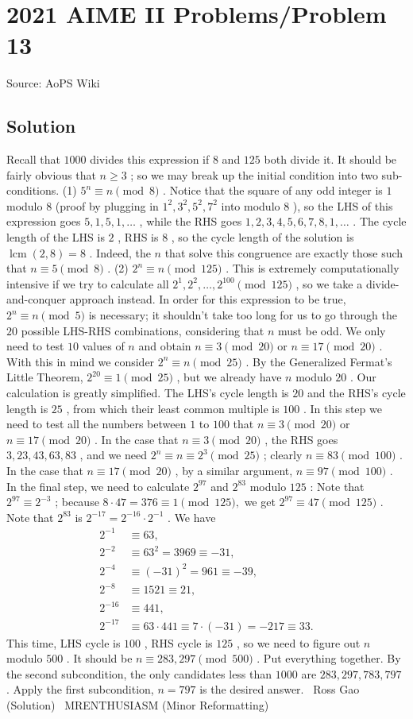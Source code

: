 \documentclass[12pt]{article}
\begin{document}
\section*{{2021 AIME II Problems/Problem 13}}
Source: AoPS Wiki

\subsection*{Solution}
Recall that $1000$ divides this expression if $8$ and $125$ both divide it. It should be fairly obvious that $n \geq 3$ ; so we may break up the initial condition into two sub-conditions. (1) $5^n \equiv n \pmod{8}$ . Notice that the square of any odd integer is $1$ modulo $8$ (proof by plugging in $1^2,3^2,5^2,7^2$ into modulo $8$ ), so the LHS of this expression goes $5,1,5,1,\ldots$ , while the RHS goes $1,2,3,4,5,6,7,8,1,\ldots$ . The cycle length of the LHS is $2$ , RHS is $8$ , so the cycle length of the solution is $\operatorname{lcm}(2,8)=8$ . Indeed, the $n$ that solve this congruence are exactly those such that $n \equiv 5 \pmod{8}$ . (2) $2^n \equiv n \pmod{125}$ . This is extremely computationally intensive if we try to calculate all $2^1,2^2,\ldots,2^{100} \pmod{125}$ , so we take a divide-and-conquer approach instead. In order for this expression to be true, $2^n \equiv n \pmod{5}$ is necessary; it shouldn't take too long for us to go through the $20$ possible LHS-RHS combinations, considering that $n$ must be odd. We only need to test $10$ values of $n$ and obtain $n \equiv 3 \pmod{20}$ or $n \equiv 17 \pmod{20}$ . With this in mind we consider $2^n \equiv n \pmod{25}$ . By the Generalized Fermat's Little Theorem, $2^{20} \equiv 1 \pmod{25}$ , but we already have $n$ modulo $20$ . Our calculation is greatly simplified. The LHS's cycle length is $20$ and the RHS's cycle length is $25$ , from which their least common multiple is $100$ . In this step we need to test all the numbers between $1$ to $100$ that $n \equiv 3 \pmod{20}$ or $n \equiv 17 \pmod{20}$ . In the case that $n \equiv 3 \pmod{20}$ , the RHS goes $3,23,43,63,83$ , and we need $2^n \equiv n \equiv 2^3 \pmod{25}$ ; clearly $n \equiv 83 \pmod{100}$ . In the case that $n \equiv 17 \pmod{20}$ , by a similar argument, $n \equiv 97 \pmod{100}$ . In the final step, we need to calculate $2^{97}$ and $2^{83}$ modulo $125$ : Note that $2^{97}\equiv2^{-3}$ ; because $8\cdot47=376\equiv1\pmod{125},$ we get $2^{97} \equiv 47\pmod{125}$ . Note that $2^{83}$ is $2^{-17}=2^{-16}\cdot2^{-1}$ . We have \begin{align*} 2^{-1}&\equiv63, \\ 2^{-2}&\equiv63^2=3969\equiv-31, \\ 2^{-4}&\equiv(-31)^2=961\equiv-39, \\ 2^{-8}&\equiv1521\equiv21, \\ 2^{-16}&\equiv441, \\ 2^{-17}&\equiv63\cdot441\equiv7\cdot(-31)=-217\equiv33. \end{align*} This time, LHS cycle is $100$ , RHS cycle is $125$ , so we need to figure out $n$ modulo $500$ . It should be $n \equiv 283,297 \pmod{500}$ . Put everything together. By the second subcondition, the only candidates less than $1000$ are $283,297,783,797$ . Apply the first subcondition, $n=\boxed{797}$ is the desired answer. ~Ross Gao (Solution) ~MRENTHUSIASM (Minor Reformatting)
\end{document}
